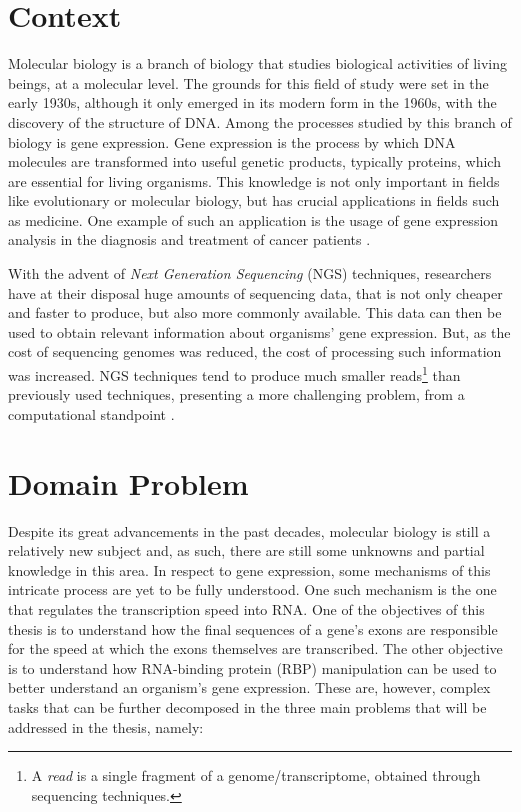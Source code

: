 \documentclass[9pt,a4paper]{extarticle}
\begin{document}
\begin{multicols}{2}

\section{Context} \label{sec:context}

Molecular biology is a branch of biology that studies biological activities of
living beings, at a molecular level. The grounds for this field of study were
set in the early 1930s, although it only emerged in its modern form in the
1960s, with the discovery of the structure of DNA. Among the processes studied
by this branch of biology is gene expression. Gene expression is the process by
which DNA molecules are transformed into useful genetic products, typically
proteins, which are essential for living organisms. This knowledge is not only
important in fields like evolutionary or molecular biology, but has crucial
applications in fields such as medicine. One example of such an application is
the usage of gene expression analysis in the diagnosis and treatment of cancer
patients \cite{Pusztai01062003}.

With the advent of \textit{Next Generation Sequencing} (NGS) techniques,
researchers have at their disposal huge amounts of sequencing data, that is not
only cheaper and faster to produce, but also more commonly available. This data
can then be used to obtain relevant information about organisms' gene
expression. But, as the cost of sequencing genomes was reduced, the cost of
processing such information was increased. NGS techniques tend to produce much
smaller reads\footnote{A \textit{read} is a single fragment of a
genome/transcriptome, obtained through sequencing techniques.} than previously
used techniques, presenting a more challenging problem, from a computational
standpoint \cite{Wolf2013}.

\section{Domain Problem} \label{sec:problem}

Despite its great advancements in the past decades, molecular biology is still a
relatively new subject and, as such, there are still some unknowns and partial
knowledge in this area. In respect to gene expression, some mechanisms of this
intricate process are yet to be fully understood. One such mechanism is the one
that regulates the transcription speed into RNA. One of the objectives of this
thesis is to understand how the final sequences of a gene's exons are
responsible for the speed at which the exons themselves are transcribed. The
other objective is to understand how RNA-binding protein (RBP) manipulation can
be used to better understand an organism's gene expression. These are, however,
complex tasks that can be further decomposed in the three main problems that
will be addressed in the thesis, namely:


\end{multicols}
\end{document}
